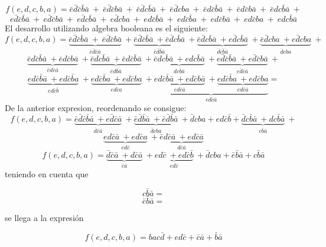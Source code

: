 \documentclass[a4paper]{article}
\begin{document}
\begin{center}
\[
	f \left( e,d,c,b,a \right) = \bar{e}\bar{d}\bar{c}\bar{b}\bar{a} \ + \ \bar{e}\bar{d}\bar{c}b\bar{a} \ + \ \bar{e}\bar{d}c\bar{b}\bar{a} \ + \ \bar{e}\bar{d}cba \ + \ \bar{e}d\bar{c}\bar{b}\bar{a} \ + \ \bar{e}d\bar{c}b\bar{a} \ + \ \bar{e}dc\bar{b}\bar{a} \ +
\]
\[
	e\bar{d}\bar{c}\bar{b}\bar{a} \ + \ e\bar{d}\bar{c}b\bar{a} \ + \ e\bar{d}c\bar{b}\bar{a} \ + \ e\bar{d}cba \ + \ ed\bar{c}\bar{b}\bar{a}\ + \ ed\bar{c}\bar{b}a \ + \ ed\bar{c}b\bar{a} \ + \ ed\bar{c}ba \ + \ edc\bar{b}\bar{a} 
\]
El desarrollo utilizando algebra booleana es el siguiente:
\[
	f \left( e,d,c,b,a \right) = \underbrace{\bar{e}\bar{d}\bar{c}\bar{b}\bar{a} \ + \ \bar{e}\bar{d}\bar{c}b\bar{a} }_{\bar{e}\bar{d}\bar{c}\bar{a}}\ + 							\underbrace{\bar{e}\bar{d}\bar{c}\bar{b}\bar{a} \ + \bar{e}\bar{d}c\bar{b}  \bar{a}  }_{\bar{e}\bar{d}\bar{b}\bar{a}}\  +
				\underbrace{\bar{e}\bar{d} c \bar{b}\bar{a} \ + e \bar{d} c\bar{b}  \bar{a}  }_{\bar{d}c\bar{b}\bar{a}}\  +
				\underbrace{\bar{e}\bar{d} c b a \ + e \bar{d} c b a  }_{ \bar{d} c b a}\ +
\]
\[
				\underbrace{\bar{e} d  \bar{c} \bar{b} \bar{a} \ + \bar{e} d \bar{c} b \bar{a}  }_{ \bar{e} d \bar{c}  \bar{a}}\ +
				\underbrace{\bar{e} d  c \bar{b} \bar{a} \ + \bar{e} d \bar{c} \bar{b} \bar{a}  }_{ \bar{e} d \bar{b}  \bar{a}}\ +
				\underbrace{\bar{e} d  c \bar{b} \bar{a} \ + e d c \bar{b} \bar{a}  }_{  d c \bar{b}  \bar{a}}\ +
				\underbrace{e \bar{d} \bar{c} \bar{b} \bar{a} \ + e \bar{d} \bar{c} b \bar{a}  }_{  e\bar{d}  \bar{c}  \bar{a}}\ +
\]
\[
				\underbrace{e d \bar{c} \bar{b} \bar{a} \ + e d \bar{c} \bar{b} a }_{  e d  \bar{c}  \bar{b}}\ +
				\underbrace{e  d \bar{c} \bar{b} a \ + e d \bar{c} b a  }_{  ed  \bar{c}  a}\ +
				\underbrace{\underbrace{e d \bar{c} \bar{b} \bar{a} \ + e d \bar{c} b \bar{a}  }_{  ed  \bar{c}  \bar{a}}\ +
				\underbrace{e d \bar{c} \bar{b} a \ + e d \bar{c} b a  }_{ ed \bar{c}  \bar{a}}}_{  ed  \bar{c}  \bar{a}} =
\]
De la anterior expresion, reordenando se consigue:
\[
				f \left( e,d,c,b,a \right) =\underbrace{\bar{e} \bar{d} \bar{c} \bar{b} \bar{a} \ + e \bar{d} \bar{c} \bar{a}  }_{  \bar{d}  \bar{c}  \bar{a}}\ +
						\underbrace{\bar{e} \bar{d} \bar{b} \bar{a}  \ + \bar{e} \bar{d} \bar{b} \bar{a}  }_{  \bar{d}  c b a}\ +
						\bar{d} cba + ed\bar{c}\bar{b}+
						\underbrace{\bar{d} c \bar{b} \bar{a} \ + d c \bar{b} \bar{a}  }_{  c \bar{b} \bar{a}}\ +
\]
\[	
					\underbrace{e d  \bar{c} \bar{a} \ + e d \bar{c} a  }_{  ed \bar{c} }\ +
					\underbrace{\bar{e} d \bar{c} \bar{a} \ + e d \bar{c} \bar{a}  }_{  d \bar{c} \bar{a}}
\]
\[	
				f \left( e,d,c,b,a \right) =\underbrace{\bar{d}   \bar{c} \bar{a} \ + d  \bar{c} \bar{a}   }_{  \bar{c}\bar{a} }\ +
						\underbrace{e  d \bar{c} \ +e d  \bar{c} \bar{b}   }_{  e  d \bar{c}  }\ +\bar{d}cba+\bar{e}\bar{b}\bar{a}+c\bar{b}\bar{a}
\]
teniendo en cuenta que 

\[
		c\bar{b}\bar{a}= 
\]
\[
		\bar{e}\bar{b}\bar{a}=
\]

se llega a la expresión

\[
		f \left( e,d,c,b,a \right) =bac\bar{d}+ed\bar{c}+\bar{c}\bar{a}+\bar{b}\bar{a}
\]
\end{center}
\end{document}
